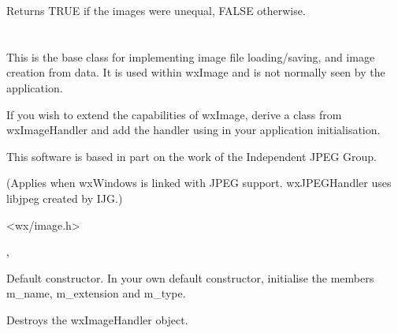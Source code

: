 


Returns TRUE if the images were unequal, FALSE otherwise.

\section{}\label{wximagehandler}

This is the base class for implementing image file loading/saving, and image creation from data.
It is used within wxImage and is not normally seen by the application.

If you wish to extend the capabilities of wxImage, derive a class from wxImageHandler
and add the handler using  in your
application initialisation.


This software is based in part on the work of the Independent JPEG Group.

(Applies when wxWindows is linked with JPEG support. wxJPEGHandler uses libjpeg
created by IJG.)




<wx/image.h>


, 


\label{wximagehandlerconstr}


Default constructor. In your own default constructor, initialise the members
m\_name, m\_extension and m\_type.



Destroys the wxImageHandler object.



